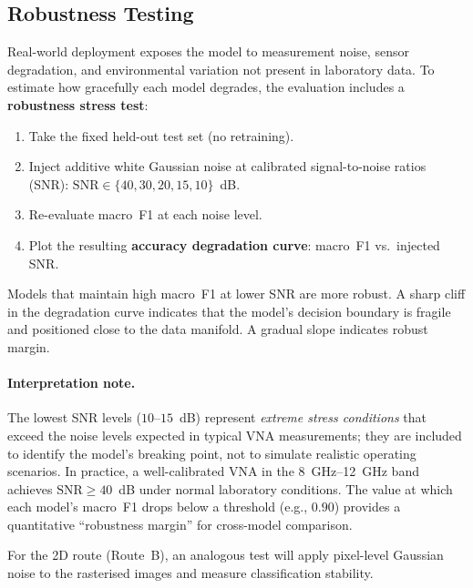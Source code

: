 \subsection{Robustness Testing}
\label{subsec:robustness}

Real-world deployment exposes the model to measurement noise, sensor
degradation, and environmental variation not present in laboratory
data.  To estimate how gracefully each model degrades, the evaluation
includes a \textbf{robustness stress test}:
%
\begin{enumerate}
  \item Take the fixed held-out test set (no retraining).
  \item Inject additive white Gaussian noise at calibrated
        signal-to-noise ratios (SNR):
        $\text{SNR} \in \{40, 30, 20, 15, 10\}$~dB.
  \item Re-evaluate macro~F1 at each noise level.
  \item Plot the resulting \textbf{accuracy degradation curve}:
        macro~F1 vs.\ injected SNR.
\end{enumerate}

Models that maintain high macro~F1 at lower SNR are more robust.
A sharp cliff in the degradation curve indicates that the model's
decision boundary is fragile and positioned close to the data
manifold.  A gradual slope indicates robust margin.

\paragraph{Interpretation note.}
The lowest SNR levels ($10$--$15$~dB) represent \emph{extreme stress
conditions} that exceed the noise levels expected in typical VNA
measurements; they are included to identify the model's breaking point,
not to simulate realistic operating scenarios.  In practice, a
well-calibrated VNA in the \SIrange{8}{12}{\giga\hertz} band achieves
$\text{SNR} \geq 40$~dB under normal laboratory conditions.  The value
at which each model's macro~F1 drops below a threshold (e.g., $0.90$)
provides a quantitative ``robustness margin'' for cross-model
comparison.

For the 2D route (Route~B), an analogous test will apply pixel-level
Gaussian noise to the rasterised images and measure classification
stability.



